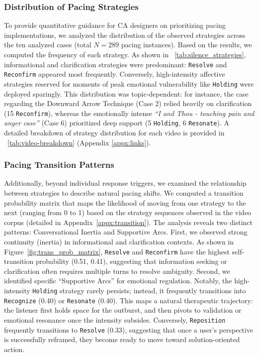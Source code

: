 \subsubsection{Distribution of Pacing Strategies}
To provide quantitative guidance for CA designers on prioritizing pacing implementations, we analyzed the distribution of the observed strategies across the ten analyzed cases (total $N=289$ pacing instances). Based on the results, we computed the frequency of each strategy. As shown in \tablename{~\ref{tab:silence_strategies}}, informational and clarification strategies were predominant: \texttt{Resolve} and \texttt{Reconfirm} appeared most frequently. Conversely, high-intensity affective strategies reserved for moments of peak emotional vulnerability like \texttt{Holding} were deployed sparingly. 
This distribution was topic-dependent: for instance, the case regarding the Downward Arrow Technique (Case 2) relied heavily on clarification (15 \texttt{Reconfirm}), whereas the emotionally intense \textit{``I and Thou - touching pain and anger case''} (Case 6) prioritized deep support (5 \texttt{Holding}, 6 \texttt{Resonate}). A detailed breakdown of strategy distribution for each video is provided in \tablename{~\ref{tab:video-breakdown}} (Appendix \ref{appx:links}).


\subsubsection{Pacing Transition Patterns}
\label{subsubsec:transition}
Additionally, beyond individual response triggers, we examined the relationship between strategies to describe natural pacing shifts. We computed a transition probability matrix \cite{thomas1983sequential, cappella1980talk} that maps the likelihood of moving from one strategy to the next (ranging from 0 to 1) based on the strategy sequences observed in the video corpus (detailed in Appendix~\ref{appx:transition}). The analysis reveals two distinct patterns: Conversational Inertia and Supportive Arcs. First, we observed strong continuity (inertia) in informational and clarification contexts. As shown in Figure~\ref{fig:trans_prob_matrix}, \texttt{Resolve} and \texttt{Reconfirm} have the highest self-transition probability (0.51, 0.41), suggesting that information seeking or clarification often requires multiple turns to resolve ambiguity. Second, we identified specific ``Supportive Arcs'' for emotional regulation. Notably, the high-intensity \texttt{Holding} strategy rarely persists; instead, it frequently transitions into \texttt{Recognize} (0.40) or \texttt{Resonate} (0.40). This maps a natural therapeutic trajectory: the listener first holds space for the outburst, and then pivots to validation or emotional resonance once the intensity subsides. Conversely, \texttt{Reposition} frequently transitions to \texttt{Resolve} (0.33), suggesting that once a user's perspective is successfully reframed, they become ready to move toward solution-oriented action.

